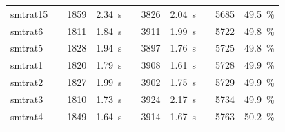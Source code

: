 \begin{table}[]
\begin{tabularx}{\textwidth}{lXrrXrrXrr}
    	\rowcolor{blue!20}
    	smtrat15
    	&& 1859 & 2.34~s
    	&& 3826 & 2.04~s
    	&& 5685 & 49.5~\%
    	\\
    	\rowcolor{green!20}
    	smtrat6
    	&& 1811 & 1.84~s
    	&& 3911 & 1.99~s
    	&& 5722 & 49.8~\%
    	\\
    	\rowcolor{green!20}
    	smtrat5
    	&& 1828 & 1.94~s
    	&& 3897 & 1.76~s
    	&& 5725 & 49.8~\%
    	\\
    	\rowcolor{green!20}
    	smtrat1
    	&& 1820 & 1.79~s
    	&& 3908 & 1.61~s
    	&& 5728 & 49.9~\%
    	\\
     	\rowcolor{green!20}
    	smtrat2
    	&& 1827 & 1.99~s
    	&& 3902 & 1.75~s
    	&& 5729 & 49.9~\%
    	\\
    	\rowcolor{green!20}
    	smtrat3
    	&& 1810 & 1.73~s
    	&& 3924 & 2.17~s
    	&& 5734 & 49.9~\%
    	\\
     	\rowcolor{green!20}
    	smtrat4
    	&& 1849 & 1.64~s
    	&& 3914 & 1.67~s
    	&& 5763 & 50.2~\%
    	\\
    	\bottomrule
    \end{tabularx}
    \label{table:results_our_solvers}
\end{table}

